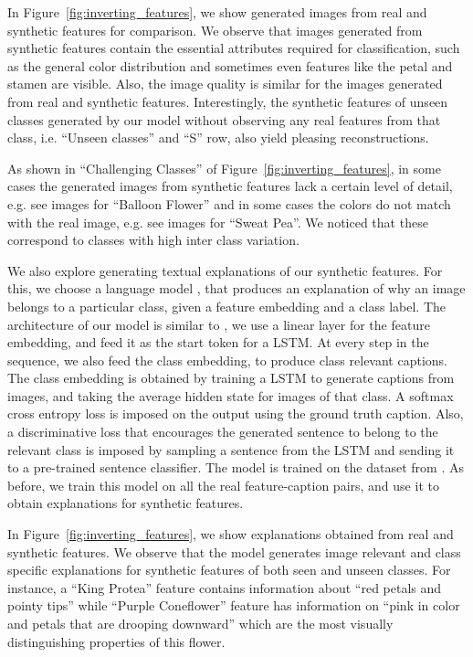 \documentclass[10pt,twocolumn,letterpaper]{article}
\newcommand{\myparagraph}[1]{\vspace{5pt}\noindent{\bf #1}}
\begin{document}
In Figure~\ref{fig:inverting_features}, we show generated images from real and synthetic features for comparison. 
We observe that images generated from synthetic features contain the essential attributes required for classification, such as the general color distribution and sometimes even features like the petal and stamen are visible. Also, the image quality is similar for the images generated from real and synthetic features. Interestingly, the synthetic features of unseen classes generated by our model without observing any real features from that class, i.e. ``Unseen classes'' and ``S'' row, also yield pleasing reconstructions.

As shown in ``Challenging Classes'' of Figure~\ref{fig:inverting_features}, in some cases the generated images from synthetic features lack a certain level of detail, e.g. see images for ``Balloon Flower'' and in some cases the colors do not match with the real image, e.g. see images for ``Sweat Pea''. We noticed that these correspond to classes with high inter class variation.

\myparagraph{Explaining visual features.}
We also explore generating textual explanations of our synthetic features. For this, we choose a language model \cite{hendricks2016generating}, that produces an explanation of why an image belongs to a particular class, given a feature embedding and a class label. The architecture of our model is similar to \cite{hendricks2016generating}, we use a linear layer for the feature embedding, and feed it as the start token for a LSTM. At every step in the sequence, we also feed the class embedding, to produce class relevant captions. The class embedding is obtained by training a LSTM to generate captions from images, and taking the average hidden state for images of that class. A softmax cross entropy loss is imposed on the output using the ground truth caption. Also, a discriminative loss that encourages the generated sentence to belong to the relevant class is imposed by sampling a sentence from the LSTM and sending it to a pre-trained sentence classifier. The model is trained on the dataset from \cite{RALS16}. As before, we train this model on all the real feature-caption pairs, and use it to obtain explanations for synthetic features. 

In Figure~\ref{fig:inverting_features}, we show explanations obtained from real and synthetic features.
We observe that the model generates image relevant and class specific explanations for synthetic features of both seen and unseen classes. 
For instance, a ``King Protea'' feature contains information about ``red petals and pointy tips'' while ``Purple Coneflower'' feature has information on ``pink in color and petals that are drooping downward'' which are the most visually distinguishing properties of this flower.
\end{document}
